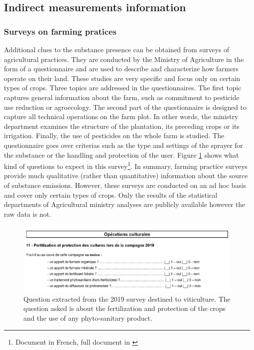 \subsection{Indirect measurements information}

\subsubsection{Surveys on farming pratices}

Additional clues to the substance presence can be obtained from surveys of agricultural practices. They are conducted by the Ministry of Agriculture in the form of a questionnaire and are used to describe and characterize how farmers operate on their land. These studies are very specific and focus only on certain types of crops. Three topics are addressed in the questionnaires. The first topic captures general information about the farm, such as commitment to pesticide use reduction or agroecology. The second part of the questionnaire is designed to capture all technical operations on the farm plot. In other words, the ministry department examines the structure of the plantation, its preceding crops or its irrigation. Finally, the use of pesticides on the whole farm is studied. The questionnaire goes over criterias such as the type and settings of the sprayer for the substance or the handling and protection of the user.  
Figure \ref{fig:PK1} shows what kind of questions to expect in this survey\footnote{Document in French, full document in \cite{PK}}. In summary, farming practice surveys provide much qualitative (rather than quantitative) information about the source of substance emissions. However, these surveys are conducted on an ad hoc basis and cover only certain types of crops. Only the results of the statistical departments of Agricultural ministry analyses \cite{PK2} are publicly available however the raw data is not. 

\begin{figure}[ht]
    \centering
    \includegraphics[scale=0.75]{figs/Chap3/PK1.pdf}
    \caption{Question extracted from the 2019 survey destined to viticulture. The question asked is about the fertilization and protection of the crops and the use of any phyto-sanitary product.}
    \label{fig:PK1}
\end{figure}

